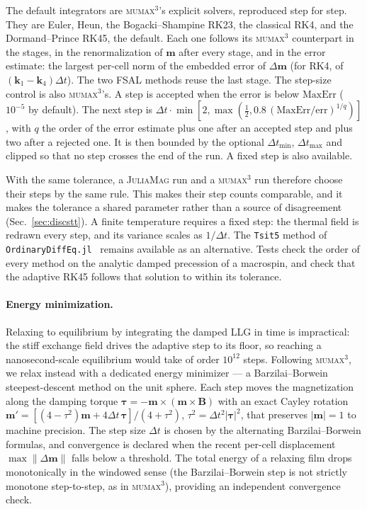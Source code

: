 \documentclass{article}      %
\newcommand{\JuliaMag}{\textsc{JuliaMag}}
\newcommand{\mumax}{\textsc{mumax}$^3$}
\newcommand{\vm}{\bm{m}}
\newcommand{\vB}{\bm{B}}
\begin{document}
The default integrators are \mumax's explicit solvers, reproduced step for step.
They are Euler, Heun, the Bogacki--Shampine RK23, the classical RK4, and the
Dormand--Prince RK45, the default. Each one follows its \mumax{} counterpart in
the stages, in the renormalization of $\vm$ after every stage, and in the error
estimate: the largest per-cell norm of the embedded error of $\Delta\vm$ (for
RK4, of $(\bm{k}_1-\bm{k}_4)\Delta t$). The two FSAL methods reuse the last stage.
The step-size control is also \mumax's. A step is accepted when the error is
below $\mathrm{MaxErr}$ ($10^{-5}$ by default). The next step is
$\Delta t\cdot\min[2,\max(\tfrac12,0.8\,(\mathrm{MaxErr}/\mathrm{err})^{1/q})]$,
with $q$ the order of the error estimate plus one after an accepted step and
plus two after a rejected one. It is then bounded by the optional
$\Delta t_{\min}$, $\Delta t_{\max}$ and clipped so that no step crosses the end
of the run. A fixed step is also available.

With the same tolerance, a \JuliaMag{} run and a \mumax{} run therefore choose
their steps by the same rule. This makes their step counts comparable, and it
makes the tolerance a shared parameter rather than a source of disagreement
(Sec.~\ref{sec:discstt}). A finite temperature requires a fixed step: the thermal
field is redrawn every step, and its variance scales as $1/\Delta t$. The
\texttt{Tsit5} method of \texttt{OrdinaryDiffEq.jl}~\cite{diffeq} remains
available as an alternative. Tests check the order of every method on the
analytic damped precession of a macrospin, and check that the adaptive RK45
follows that solution to within its tolerance.

\paragraph{Energy minimization.}
Relaxing to equilibrium by integrating the damped LLG in time is impractical: the
stiff exchange field drives the adaptive step to its floor, so reaching a
nanosecond-scale equilibrium would take of order $10^{12}$ steps. Following
\mumax{}, we relax instead with a dedicated energy minimizer --- a
Barzilai--Borwein steepest-descent method on the unit sphere. Each step moves the
magnetization along the damping torque $\bm{\tau}=-\vm\times(\vm\times\vB)$ with an
exact Cayley rotation
$\vm' = [(4-\tau^2)\vm + 4\Delta t\,\bm{\tau}]/(4+\tau^2)$, $\tau^2=\Delta t^2|\bm{\tau}|^2$,
that preserves $|\vm|=1$ to machine precision. The step size $\Delta t$ is chosen
by the alternating Barzilai--Borwein formulas, and convergence is declared when
the recent per-cell displacement $\max\|\Delta\vm\|$ falls below a threshold. The
total energy of a relaxing film drops monotonically in the windowed sense (the
Barzilai--Borwein step is not strictly monotone step-to-step, as in \mumax{}),
providing an independent convergence check.
\end{document}
